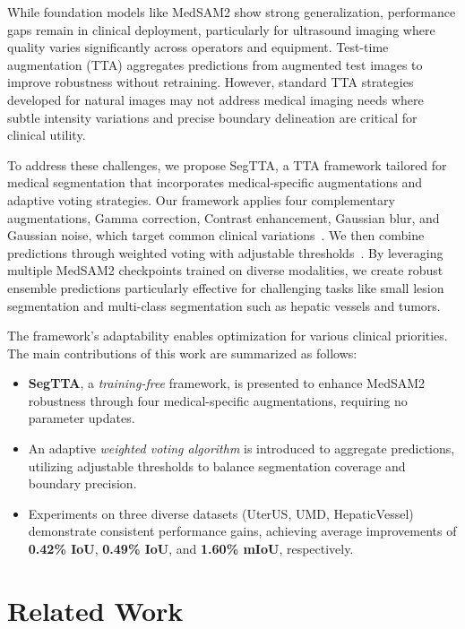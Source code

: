 \documentclass{article}
\begin{document}
While foundation models like MedSAM2 show strong generalization\cite{ma2025medsam2}, performance gaps remain in clinical deployment, particularly for ultrasound imaging where quality varies significantly across operators and equipment. Test-time augmentation (TTA) aggregates predictions from augmented test images to improve robustness without retraining\cite{ma2024test}. However, standard TTA strategies developed for natural images may not address medical imaging needs where subtle intensity variations and precise boundary delineation are critical for clinical utility\cite{nazzal2024improving}.

To address these challenges, we propose SegTTA, a TTA framework tailored for medical segmentation that incorporates medical-specific augmentations and adaptive voting strategies. Our framework applies four complementary augmentations, Gamma correction, Contrast enhancement, Gaussian blur, and Gaussian noise, which target common clinical variations~\cite{kallel2018ct}. We then combine predictions through weighted voting with adjustable thresholds~\cite{tasci2021voting}. By leveraging multiple MedSAM2 checkpoints trained on diverse modalities, we create robust ensemble predictions particularly effective for challenging tasks like small lesion segmentation and multi-class segmentation such as hepatic vessels and tumors.

The framework's adaptability enables optimization for various clinical priorities. The main contributions of this work are summarized as follows:

\begin{itemize}
    \item \textbf{SegTTA}, a \textit{training-free} framework, is presented to enhance MedSAM2 robustness through four medical-specific augmentations, requiring no parameter updates.
    
    \item An adaptive \textit{weighted voting algorithm} is introduced to aggregate predictions, utilizing adjustable thresholds to balance segmentation coverage and boundary precision.
    
    \item Experiments on three diverse datasets (UterUS, UMD, HepaticVessel) demonstrate consistent performance gains, achieving average improvements of \textbf{0.42\% IoU}, \textbf{0.49\% IoU}, and \textbf{1.60\% mIoU}, respectively.
\end{itemize}

\section{Related Work}
\label{sec:headings}
\end{document}

